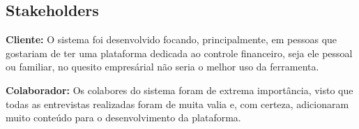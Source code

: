 \subsection{Stakeholders}

\textbf{Cliente:} O sistema foi desenvolvido focando, principalmente, em pessoas que gostariam de ter uma plataforma dedicada ao controle financeiro, seja ele pessoal ou familiar, no quesito empresárial não seria o melhor uso da ferramenta.

\textbf{Colaborador:} Os colabores do sistema foram de extrema importância, visto que todas as entrevistas realizadas foram de muita valia e, com certeza, adicionaram muito conteúdo para o desenvolvimento da plataforma.